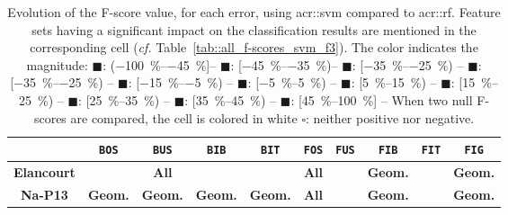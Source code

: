         \begin{table}[htbp]
            \footnotesize 
            \centering
            \renewcommand{\arraystretch}{3}
            \begin{tabular}{| c | c c c c |c c c c c |}
                \hline
                & \texttt{BOS} & \texttt{BUS}&\texttt{BIB}&\texttt{BIT}&\texttt{FOS} & \texttt{FUS}&\texttt{FIB}&\texttt{FIT}&\texttt{FIG}\\
                \hline
                \textbf{Elancourt} & \cellcolor{GAIN0515} & \cellcolor{STBL} \textbf{All} & \cellcolor{GAIN45} & \cellcolor{GAIN45} & \cellcolor{LOSS1525} \textbf{All} & \cellcolor{GAIN2535} & \cellcolor{GAIN2535}  \textbf{Geom.} & \cellcolor{GAIN45} & \cellcolor{GAIN0515} \textbf{Geom.} \\
                \textbf{Na-P13} & \cellcolor{LOSS0515} \textbf{Geom.} & \cellcolor{LOSS0515} \textbf{Geom.} & \cellcolor{GAIN1525} \textbf{Geom.} & \cellcolor{GAIN3545} \textbf{Geom.} & \cellcolor{LOSS0515} \textbf{All} & \cellcolor{LOSS3545} & \cellcolor{LOSS0515} \textbf{Geom.} & \cellcolor{GAIN45} & \cellcolor{STBL} \textbf{Geom.} \\
                \hline
            \end{tabular}
            \renewcommand{\arraystretch}{1}
            \caption{
                \label{tab::rf_vs_svm_comparison} Evolution of the F-score value, for each error, using \gls{acr::svm} compared to \gls{acr::rf}.
                Feature sets having a significant impact on the classification results are mentioned in the corresponding cell (\textit{cf.} Table~\ref{tab::all_f-scores_svm_f3}).
                The color indicates the magnitude:
                \textcolor{LOSS45}{\(\blacksquare\)}: (\SIrange[range-phrase={,  }]{-100}{-45}{\percent}]--
                \textcolor{LOSS3545}{\(\blacksquare\)}: [\SIrange[range-phrase={,  }]{-45}{-35}{\percent})--
                \textcolor{LOSS2535}{\(\blacksquare\)}: [\SIrange[range-phrase={, }]{-35}{-25}{\percent}) --
                \textcolor{LOSS1525}{\(\blacksquare\)}: [\SIrange[range-phrase={, }]{-35}{-25}{\percent}) --
                \textcolor{LOSS0515}{\(\blacksquare\)}: [\SIrange[range-phrase={, }]{-15}{-5}{\percent}) --
                \textcolor{STBL}{\(\blacksquare\)}: [\SIrange[range-phrase={, }]{-5}{5}{\percent}) --
                \textcolor{GAIN0515}{\(\blacksquare\)}: [\SIrange[range-phrase={, }]{5}{15}{\percent}) --
                \textcolor{GAIN1525}{\(\blacksquare\)}: [\SIrange[range-phrase={, }]{15}{25}{\percent}) --
                \textcolor{GAIN2535}{\(\blacksquare\)}: [\SIrange[range-phrase={, }]{25}{35}{\percent}) --
                \textcolor{GAIN3545}{\(\blacksquare\)}: [\SIrange[range-phrase={, }]{35}{45}{\percent}) --
                \textcolor{GAIN45}{\(\blacksquare\)}: [\SIrange[range-phrase={, }]{45}{100}{\percent}] --
                When two null F-scores are compared, the cell is colored in white \(\square\): neither positive nor negative.
            }
        \end{table}


